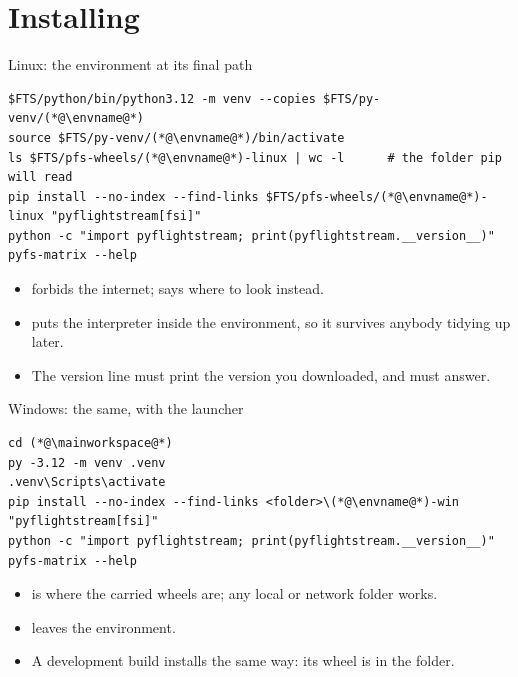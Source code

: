 \documentclass[aspectratio=169,11pt]{beamer}
\begin{document}
\section{Installing}

\begin{frame}[fragile]{Linux: the environment at its final path}
\begin{lstlisting}[style=ftsbase]
$FTS/python/bin/python3.12 -m venv --copies $FTS/py-venv/(*@\envname@*)
source $FTS/py-venv/(*@\envname@*)/bin/activate
ls $FTS/pfs-wheels/(*@\envname@*)-linux | wc -l      # the folder pip will read
pip install --no-index --find-links $FTS/pfs-wheels/(*@\envname@*)-linux "pyflightstream[fsi]"
python -c "import pyflightstream; print(pyflightstream.__version__)"
pyfs-matrix --help
\end{lstlisting}
\begin{itemize}\small
  \item {} forbids the internet;  says where
        to look instead.
  \item {} puts the interpreter inside the environment, so it
        survives anybody tidying up  later.
  \item The version line must print the version you downloaded, and
         must answer.
\end{itemize}
\end{frame}

\begin{frame}[fragile]{Windows: the same, with the launcher}
\begin{lstlisting}[style=ftsbase]
cd (*@\mainworkspace@*)
py -3.12 -m venv .venv
.venv\Scripts\activate
pip install --no-index --find-links <folder>\(*@\envname@*)-win "pyflightstream[fsi]"
python -c "import pyflightstream; print(pyflightstream.__version__)"
pyfs-matrix --help
\end{lstlisting}
\begin{itemize}\small
  \item {} is where the carried wheels are; any local or network
        folder works.
  \item {} leaves the environment.
  \item A development build installs the same way: its wheel is in the folder.
\end{itemize}
\end{frame}
\end{document}
